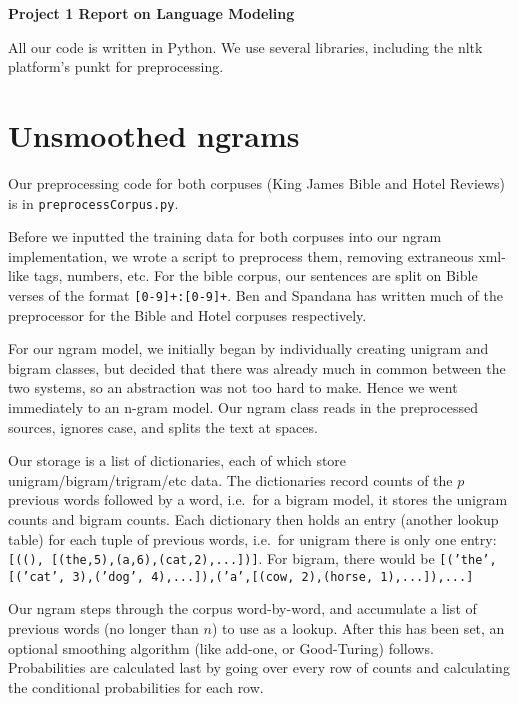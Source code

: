 \documentclass{article}
\begin{document}
\begin{center}\textbf{Project 1 Report on Language Modeling}\end{center}

All our code is written in Python. We use several libraries, including the nltk platform's punkt for preprocessing.\par

\section{Unsmoothed ngrams}
Our preprocessing code for both corpuses (King James Bible and Hotel Reviews) is in \texttt{preprocessCorpus.py}.\par

Before we inputted the training data for both corpuses into our ngram implementation, we wrote a script to preprocess them, removing extraneous xml-like tags, numbers, etc. For the bible corpus, our sentences are split on Bible verses of the format \texttt{[0-9]+:[0-9]+}. Ben and Spandana has written much of the preprocessor for the Bible and Hotel corpuses respectively.\par

For our ngram model, we initially began by individually creating unigram and bigram classes, but decided that there was already much in common between the two systems, so an abstraction was not too hard to make. Hence we went immediately to an n-gram model. Our ngram class reads in the preprocessed sources, ignores case, and splits the text at spaces.\par

Our storage is a list of dictionaries, each of which store unigram/bigram/trigram/etc data. The dictionaries record counts of the $p$ previous words followed by a word, i.e.\ for a bigram model, it stores the unigram counts and bigram counts. Each dictionary then holds an entry (another lookup table) for each tuple of previous words, i.e.\ for unigram there is only one entry: \texttt{[((), [(the,5),(a,6),(cat,2),...])]}. For bigram, there would be \texttt{[('the',[('cat', 3),('dog', 4),...]),('a',[(cow, 2),(horse, 1),...]),...]}\par

Our ngram steps through the corpus word-by-word, and accumulate a list of previous words (no longer than $n$) to use as a lookup. After this has been set, an optional smoothing algorithm (like add-one, or Good-Turing) follows. Probabilities are calculated last by going over every row of counts and calculating the conditional probabilities for each row.\par
\end{document}
